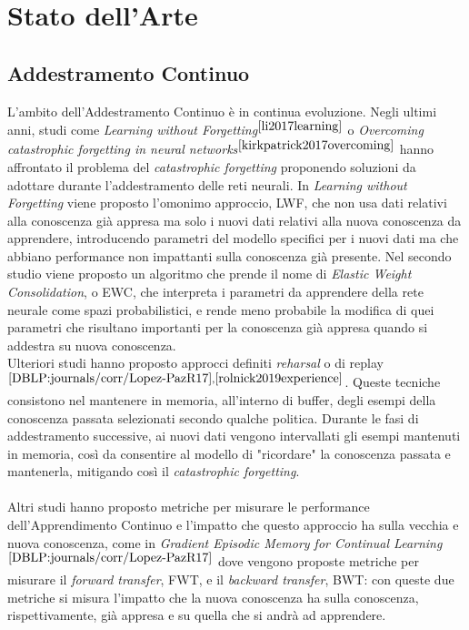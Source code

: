 \section{Stato dell'Arte}
\subsection{Addestramento Continuo} L'ambito dell'Addestramento Continuo è in continua evoluzione. Negli ultimi anni, studi come \textit{Learning without Forgetting}$^{\cite{li2017learning}}$ o \textit{Overcoming catastrophic forgetting in neural networks}$^{\cite{kirkpatrick2017overcoming}}$ hanno affrontato il problema del \textit{catastrophic forgetting} proponendo soluzioni da adottare durante l'addestramento delle reti neurali. In \textit{Learning without Forgetting} viene proposto l'omonimo approccio, LWF, che non usa dati relativi alla conoscenza già appresa ma solo i nuovi dati relativi alla nuova conoscenza da apprendere, introducendo parametri del modello specifici per i nuovi dati ma che abbiano performance non impattanti sulla conoscenza già presente. Nel secondo studio viene proposto un algoritmo che prende il nome di \textit{Elastic Weight Consolidation}, o EWC, che interpreta i parametri da apprendere della rete neurale come spazi probabilistici, e rende meno probabile la modifica di quei parametri che risultano importanti per la conoscenza già appresa quando si addestra su nuova conoscenza.\\
Ulteriori studi hanno proposto approcci definiti \textit{reharsal} o di replay$^{\cite{DBLP:journals/corr/Lopez-PazR17},\cite{rolnick2019experience}}$. Queste tecniche consistono nel mantenere in memoria, all'interno di buffer, degli esempi della conoscenza passata selezionati secondo qualche politica. Durante le fasi di addestramento successive, ai nuovi dati vengono intervallati gli esempi mantenuti in memoria, così da consentire al modello di "ricordare" la conoscenza passata e mantenerla, mitigando così il \textit{catastrophic forgetting}.\\\\
Altri studi hanno proposto metriche per misurare le performance dell'Apprendimento Continuo e l'impatto che questo approccio ha sulla vecchia e nuova conoscenza, come in \textit{Gradient Episodic Memory for Continual Learning}$^{\cite{DBLP:journals/corr/Lopez-PazR17}}$ dove vengono proposte metriche per misurare il \textit{forward transfer}, FWT, e il \textit{backward transfer}, BWT: con queste due metriche si misura l'impatto che la nuova conoscenza ha sulla conoscenza, rispettivamente, già appresa e su quella che si andrà ad apprendere.\\\\
